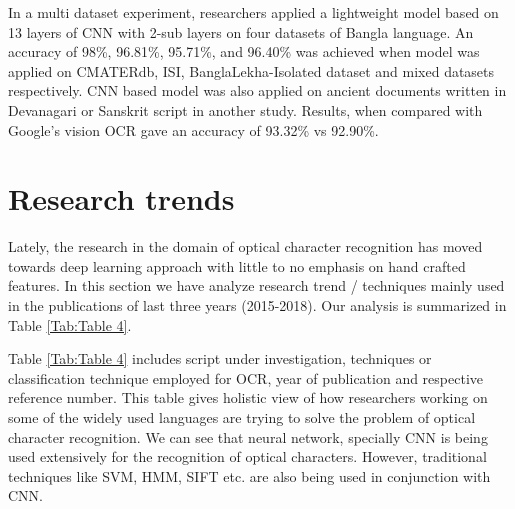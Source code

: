 \documentclass{article}
\begin{document}
In a multi dataset experiment\cite{rabby2018bornonet}, researchers applied a lightweight model based on 13 layers of CNN with 2-sub layers on four datasets of Bangla language.  An accuracy of 98\%, 96.81\%, 95.71\%, and 96.40\% was achieved when model was applied on CMATERdb, ISI, BanglaLekha-Isolated dataset and mixed datasets respectively. CNN based model was also applied on ancient documents written in Devanagari or Sanskrit script in another study. Results, when compared with Google's vision OCR gave an accuracy of 93.32\% vs 92.90\%. 




\section{Research trends} \label{future}

Lately, the research in the domain of optical character recognition has moved towards deep learning approach \cite{naz2017urdu,al2018deep} with little to no emphasis on hand crafted features. In this section we have analyze research trend / techniques mainly used in the publications of last three years (2015-2018). Our analysis is summarized in Table \ref{Tab:Table 4}. 

Table \ref{Tab:Table 4} includes script under investigation, techniques or classification technique employed for OCR, year of publication and respective reference number. This table gives holistic view of how researchers working on some of the widely used languages are trying to solve the problem of optical character recognition. We can see that neural network, specially CNN is being used extensively for the recognition of optical characters. However, traditional techniques like SVM, HMM, SIFT etc. are also being used in conjunction with CNN. 
\end{document}
